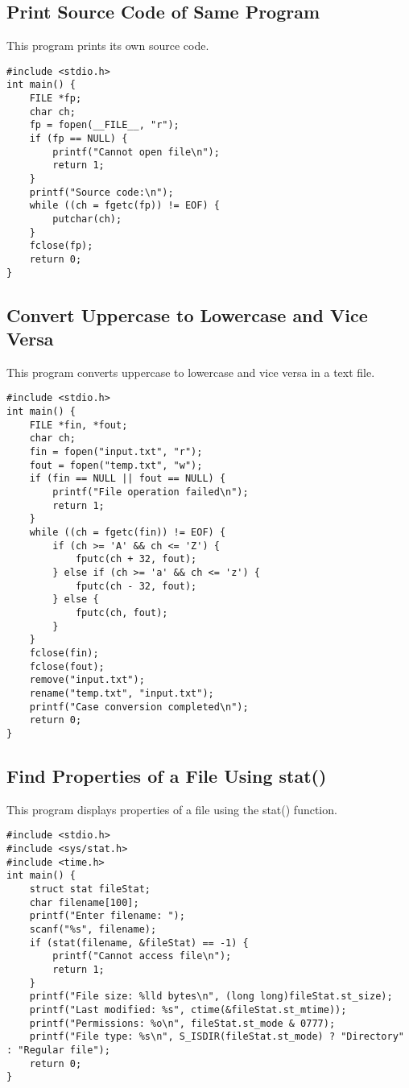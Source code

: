 \documentclass[a4paper,12pt]{article}
\begin{document}
\subsection{Print Source Code of Same Program}
This program prints its own source code.
\begin{lstlisting}[caption={Print Source Code of Same Program}]
#include <stdio.h>
int main() {
    FILE *fp;
    char ch;
    fp = fopen(__FILE__, "r");
    if (fp == NULL) {
        printf("Cannot open file\n");
        return 1;
    }
    printf("Source code:\n");
    while ((ch = fgetc(fp)) != EOF) {
        putchar(ch);
    }
    fclose(fp);
    return 0;
}
\end{lstlisting}
\clearpage

\subsection{Convert Uppercase to Lowercase and Vice Versa}
This program converts uppercase to lowercase and vice versa in a text file.
\begin{lstlisting}[caption={Convert Uppercase to Lowercase and Vice Versa}]
#include <stdio.h>
int main() {
    FILE *fin, *fout;
    char ch;
    fin = fopen("input.txt", "r");
    fout = fopen("temp.txt", "w");
    if (fin == NULL || fout == NULL) {
        printf("File operation failed\n");
        return 1;
    }
    while ((ch = fgetc(fin)) != EOF) {
        if (ch >= 'A' && ch <= 'Z') {
            fputc(ch + 32, fout);
        } else if (ch >= 'a' && ch <= 'z') {
            fputc(ch - 32, fout);
        } else {
            fputc(ch, fout);
        }
    }
    fclose(fin);
    fclose(fout);
    remove("input.txt");
    rename("temp.txt", "input.txt");
    printf("Case conversion completed\n");
    return 0;
}
\end{lstlisting}
\clearpage

\subsection{Find Properties of a File Using stat()}
This program displays properties of a file using the stat() function.
\begin{lstlisting}[caption={Find Properties of a File Using stat()}]
#include <stdio.h>
#include <sys/stat.h>
#include <time.h>
int main() {
    struct stat fileStat;
    char filename[100];
    printf("Enter filename: ");
    scanf("%s", filename);
    if (stat(filename, &fileStat) == -1) {
        printf("Cannot access file\n");
        return 1;
    }
    printf("File size: %lld bytes\n", (long long)fileStat.st_size);
    printf("Last modified: %s", ctime(&fileStat.st_mtime));
    printf("Permissions: %o\n", fileStat.st_mode & 0777);
    printf("File type: %s\n", S_ISDIR(fileStat.st_mode) ? "Directory" : "Regular file");
    return 0;
}
\end{lstlisting}
\clearpage
\end{document}
